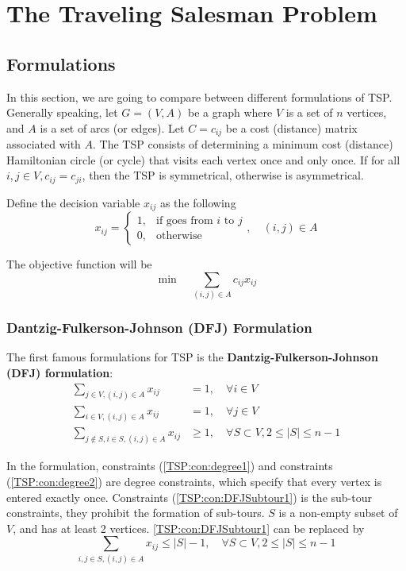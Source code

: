		\chapter{The Traveling Salesman Problem}\label{chp:TSP}
			\section{Formulations}
				In this section, we are going to compare between different formulations of TSP. Generally speaking, let $G = (V, A)$ be a graph where $V$ is a set of $n$ vertices, and $A$ is a set of arcs (or edges). Let $C = c_{ij}$ be a cost (distance) matrix associated with $A$. The TSP consists of determining a minimum cost (distance) Hamiltonian circle (or cycle) that visits each vertex once and only once. If for all $i, j \in V, c_{ij} = c_{ji}$, then the TSP is symmetrical, otherwise is asymmetrical.

				Define the decision variable $x_{ij}$ as the following
				\begin{equation}
					x_{ij} = \begin{cases}
								1, &\text{if goes from } i \text{ to } j\\ 
								0, & \text{otherwise}
							\end{cases}, \quad (i, j) \in A
				\end{equation}

				The objective function will be
				\begin{equation}
					\min \quad \sum_{(i, j)\in A} c_{ij}x_{ij}
				\end{equation}

				\subsection{Dantzig-Fulkerson-Johnson (DFJ) Formulation}
					The first famous formulations for TSP is the \textbf{Dantzig-Fulkerson-Johnson (DFJ) formulation}:
					\begin{align}
						\sum_{j \in V, (i,j)\in A} x_{ij} & = 1, \quad \forall i \in V \label{TSP:con:degree1}\\
						\sum_{i \in V, (i,j)\in A} x_{ij} & = 1, \quad \forall j \in V \label{TSP:con:degree2}\\
						\sum_{j\notin S, i\in S, (i,j)\in A} x_{ij} & \ge 1, \quad \forall S \subset V, 2\le |S| \le n-1 \label{TSP:con:DFJSubtour1}
					\end{align}

					In the formulation, constraints (\ref{TSP:con:degree1}) and constraints (\ref{TSP:con:degree2}) are degree constraints, which specify that every vertex is entered exactly once. Constraints (\ref{TSP:con:DFJSubtour1}) is the sub-tour constraints, they prohibit the formation of sub-tours. $S$ is a non-empty subset of $V$, and has at least 2 vertices. \ref{TSP:con:DFJSubtour1} can be replaced by
					\begin{equation}
						\sum_{i, j \in S, (i, j) \in A} x_{ij} \le |S| - 1, \quad \forall S \subset V, 2\le |S| \le n-1\label{TSP:con:DFJSubtour2}
					\end{equation}

